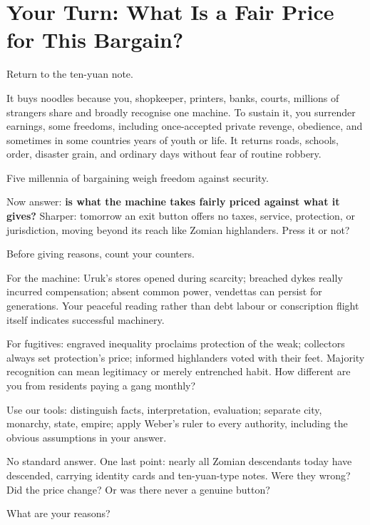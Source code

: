 \section[Your Turn: What Price Is Fair?]{Your Turn: What Is a Fair Price for This Bargain?}
Return to the ten-yuan note.

It buys noodles because you, shopkeeper, printers, banks, courts, millions of strangers share and broadly recognise one machine. To sustain it, you surrender earnings, some freedoms, including once-accepted private revenge, obedience, and sometimes in some countries years of youth or life. It returns roads, schools, order, disaster grain, and ordinary days without fear of routine robbery.

Five millennia of bargaining weigh freedom against security.

Now answer: \textbf{is what the machine takes fairly priced against what it gives?} Sharper: tomorrow an exit button offers no taxes, service, protection, or jurisdiction, moving beyond its reach like Zomian highlanders. Press it or not?

Before giving reasons, count your counters.

For the machine: Uruk's stores opened during scarcity; breached dykes really incurred compensation; absent common power, vendettas can persist for generations. Your peaceful reading rather than debt labour or conscription flight itself indicates successful machinery.

For fugitives: engraved inequality proclaims protection of the weak; collectors always set protection's price; informed highlanders voted with their feet. Majority recognition can mean legitimacy or merely entrenched habit. How different are you from residents paying a gang monthly?

Use our tools: distinguish facts, interpretation, evaluation; separate city, monarchy, state, empire; apply Weber's ruler to every authority, including the obvious assumptions in your answer.

No standard answer. One last point: nearly all Zomian descendants today have descended, carrying identity cards and ten-yuan-type notes. Were they wrong? Did the price change? Or was there never a genuine button?

What are your reasons?
